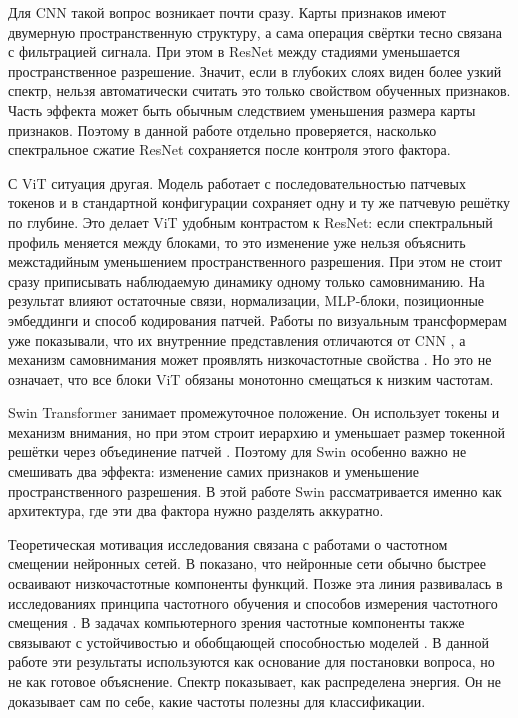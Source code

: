 Для CNN такой вопрос возникает почти сразу. Карты признаков имеют двумерную пространственную структуру, а сама операция свёртки тесно связана с фильтрацией сигнала. При этом в ResNet между стадиями уменьшается пространственное разрешение. Значит, если в глубоких слоях виден более узкий спектр, нельзя автоматически считать это только свойством обученных признаков. Часть эффекта может быть обычным следствием уменьшения размера карты признаков. Поэтому в данной работе отдельно проверяется, насколько спектральное сжатие ResNet сохраняется после контроля этого фактора.

С ViT ситуация другая. Модель работает с последовательностью патчевых токенов и в стандартной конфигурации сохраняет одну и ту же патчевую решётку по глубине. Это делает ViT удобным контрастом к ResNet: если спектральный профиль меняется между блоками, то это изменение уже нельзя объяснить межстадийным уменьшением пространственного разрешения. При этом не стоит сразу приписывать наблюдаемую динамику одному только самовниманию. На результат влияют остаточные связи, нормализации, MLP-блоки, позиционные эмбеддинги и способ кодирования патчей. Работы по визуальным трансформерам уже показывали, что их внутренние представления отличаются от CNN \cite{raghu2021do}, а механизм самовнимания может проявлять низкочастотные свойства \cite{park2022how}. Но это не означает, что все блоки ViT обязаны монотонно смещаться к низким частотам.

Swin Transformer занимает промежуточное положение. Он использует токены и механизм внимания, но при этом строит иерархию и уменьшает размер токенной решётки через объединение патчей \cite{liu2021swin}. Поэтому для Swin особенно важно не смешивать два эффекта: изменение самих признаков и уменьшение пространственного разрешения. В этой работе Swin рассматривается именно как архитектура, где эти два фактора нужно разделять аккуратно.

Теоретическая мотивация исследования связана с работами о частотном смещении нейронных сетей. В \cite{rahaman2019spectral} показано, что нейронные сети обычно быстрее осваивают низкочастотные компоненты функций. Позже эта линия развивалась в исследованиях принципа частотного обучения и способов измерения частотного смещения \cite{xu2025overview,kiessling2022computable}. В задачах компьютерного зрения частотные компоненты также связывают с устойчивостью и обобщающей способностью моделей \cite{yin2019fourier,wang2020highfrequency}. В данной работе эти результаты используются как основание для постановки вопроса, но не как готовое объяснение. Спектр показывает, как распределена энергия. Он не доказывает сам по себе, какие частоты полезны для классификации.

